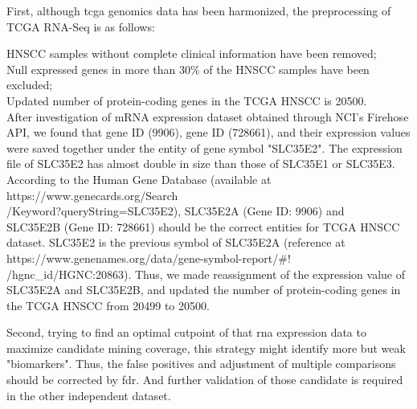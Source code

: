 \documentclass[preprint,12pt]{elsarticle}
\newenvironment{MyColorPar}[1]{%
    \leavevmode\color{#1}\ignorespaces%
}{%
}%
\begin{document}
\begin{MyColorPar}{blue}
\begin{MyColorPar}{red}
First, although \acrshort{tcga} genomics data has been harmonized, 
the preprocessing of TCGA RNA-Seq is as follows: 

\begin{outline}
\1 HNSCC samples without complete clinical information have been removed;\\
\1 Null expressed genes in more than 30\% of the HNSCC samples have been excluded;\\

\1 Updated number of protein-coding genes in the TCGA HNSCC is 20500.\\
After investigation of mRNA expression dataset obtained through NCI's Firehose API, we found that gene ID (9906), gene ID (728661), and their expression values were saved together under the entity of gene symbol "SLC35E2".
The expression file of SLC35E2 has almost double in size than those of SLC35E1 or SLC35E3.
According to the Human Gene Database (available at https://www.genecards.org/Search\\/Keyword?queryString=SLC35E2), SLC35E2A (Gene ID: 9906) and\\ SLC35E2B (Gene ID: 728661) should be the correct entities for TCGA HNSCC dataset.
SLC35E2 is the previous symbol of SLC35E2A (reference at https://www.genenames.org/data/gene-symbol-report/\#!\\/hgnc\_id/HGNC:20863).
Thus, we made reassignment of the expression value of SLC35E2A and SLC35E2B, and updated the number of protein-coding genes in the TCGA HNSCC from 20499 to 20500.
\end{outline}


Second, trying to find an optimal cutpoint of that \acrshort{rna} expression data to maximize candidate mining coverage, this strategy might identify more but weak "biomarkers". 
Thus, the false positives and adjustment of multiple comparisons should be corrected by \acrfull{fdr}.
And further validation of those candidate is required in the other independent dataset.%


\end{MyColorPar}
\end{MyColorPar}
\end{document}
